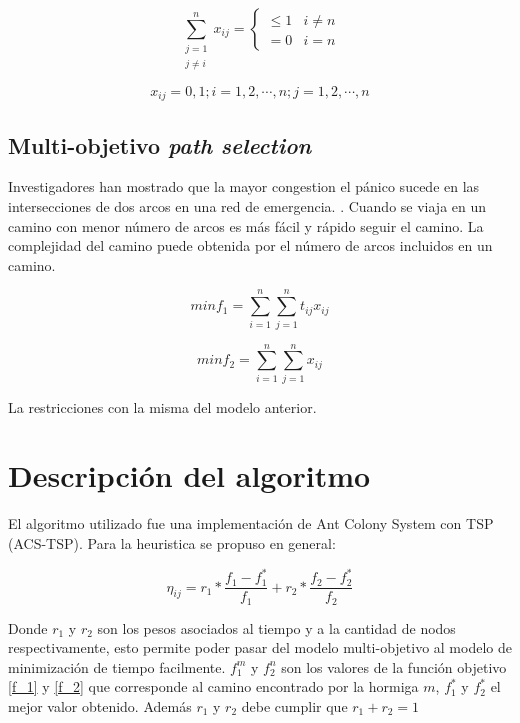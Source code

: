 \documentclass[letter, 10pt]{article}
\begin{document}
\begin{equation}\label{circles}
	\sum_{\substack{j=1\\
                  j \neq i}}^n x_{ij} = \begin{cases}
\leq 1 & i\neq n\\
=0 & i=n 
\end{cases}
\end{equation}

\begin{equation}
	x_{ij} = 0,1;i=1,2,\cdots,n;j=1,2,\cdots,n
\end{equation}

\subsection{Multi-objetivo \textit{path selection}}

Investigadores han mostrado que la mayor congestion el pánico sucede en las intersecciones de dos arcos en una red de emergencia. \cite{southworth1991regional} \cite{cova2003network}. Cuando se viaja en un camino con menor número de arcos es más fácil y rápido seguir el camino. La complejidad del camino puede obtenida por el número de arcos incluidos en un camino. 


\begin{equation}\label{f_1}
	min f_1 = \sum_{i=1}^{n}\sum_{j=1}^{n} t_{ij}x_{ij}
\end{equation}


\begin{equation}\label{f_2}
	min f_2 = \sum_{i=1}^{n}\sum_{j=1}^{n} x_{ij}
\end{equation}

La restricciones con la misma del modelo anterior.

\section{Descripción del algoritmo}

El algoritmo utilizado fue una implementación de Ant Colony System con TSP (ACS-TSP). Para la heuristica se propuso en general:

\begin{equation}
	\eta_{ij} = r_1*\frac{f_1 - f_1^*}{f_1} + r_2*\frac{f_2 - f_2^*}{f_2}
\end{equation}

Donde $r_1$ y $r_2$ son los pesos asociados al tiempo y a la cantidad de nodos respectivamente, esto permite poder pasar del modelo multi-objetivo al modelo de minimización de tiempo facilmente.  $f_1^m$ y $f_2^n$ son los valores de la función objetivo \eqref{f_1} y \eqref{f_2} que corresponde al camino encontrado por la hormiga $m$, $f_1^*$ y $f_2^*$ el mejor valor obtenido. Además $r_1$ y $r_2$ debe cumplir que $r_1 + r_2 = 1$
\end{document}
